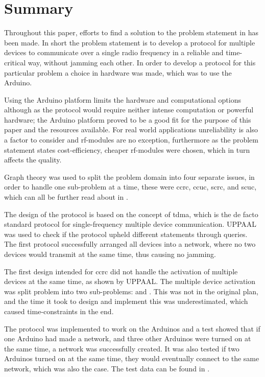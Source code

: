 \chapter{Summary}\label{cha:conclusion}
Throughout this paper, efforts to find a solution to the problem statement in  has been made.
In short the problem statement is to develop a protocol for multiple devices to communicate over a single radio frequency in a reliable and time-critical way, without jamming each other.
In order to develop a protocol for this particular problem a choice in hardware was made, which was to use the Arduino.

Using the Arduino platform limits the hardware and computational options although as the protocol would require neither intense computation or powerful hardware; the Arduino platform proved to be a good fit for the purpose of this paper and the resources available.
For real world applications unreliability is also a factor to consider and \gls{rf}-modules are no exception, furthermore as the problem statement states cost-efficiency, cheaper \gls{rf}-modules were chosen, which in turn affects the quality.

\bigskip \noindent
Graph theory was used to split the problem domain into four separate issues, in order to handle one sub-problem at a time, these were \acrfull{ccrc}, \acrfull{ccuc}, \acrfull{scrc}, and \acrfull{scuc}, which can all be further read about in .

The design of the protocol is based on the concept of \acrfull{tdma}, which is the de facto standard protocol for single-frequency multiple device communication.
UPPAAL was used to check if the protocol upheld different statements through queries.
The first protocol successfully arranged all devices into a network, where no two devices would transmit at the same time, thus causing no jamming.

The first design intended for \acrshort{ccrc} did not handle the activation of multiple devices at the same time, as shown by UPPAAL.
The multiple device activation was split problem into two sub-problems:  and .
This was not in the original plan, and the time it took to design and implement this was underestimated, which caused time-constraints in the end.

The protocol was implemented to work on the Arduinos and a test showed that if one Arduino had made a network, and three other Arduinos were turned on at the same time, a network was successfully created.
It was also tested if two Arduinos turned on at the same time, they would eventually connect to the same network, which was also the case.
The test data can be found in .

